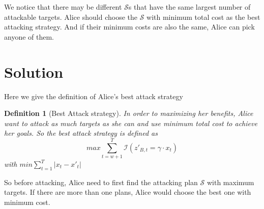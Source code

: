 \documentclass[journal]{IEEEtran}
\newtheorem{definition}{Definition}
\begin{document}
We notice that there may be different $\mathcal{S}$s that have the same largest number of attackable targets. Alice should choose the $\mathcal{S}$ with minimum total cost as the best attacking strategy. And if their minimum costs are also the same, Alice can pick anyone of them.

\section{Solution}\label{sec:sol} 

Here we give the definition of Alice's best attack strategy
\begin{definition}[Best Attack strategy]
In order to maximizing her benefits, Alice want to attack as much targets as she can and use minimum total cost to achieve her goals. So the best attack strategy is defined as 
\begin{equation}
    max \sum_{t=w+1}^T \mathcal{I}(z'_{B,t}= \gamma \cdot x_t)
\end{equation}
with $min \sum_{t=1}^T |x_t - x'_t|$
\end{definition}
So before attacking, Alice need to first find the attacking plan $\mathcal{S}$ with maximum targets. If there are more than one plans, Alice would choose the best one with minimum cost.
\end{document}

